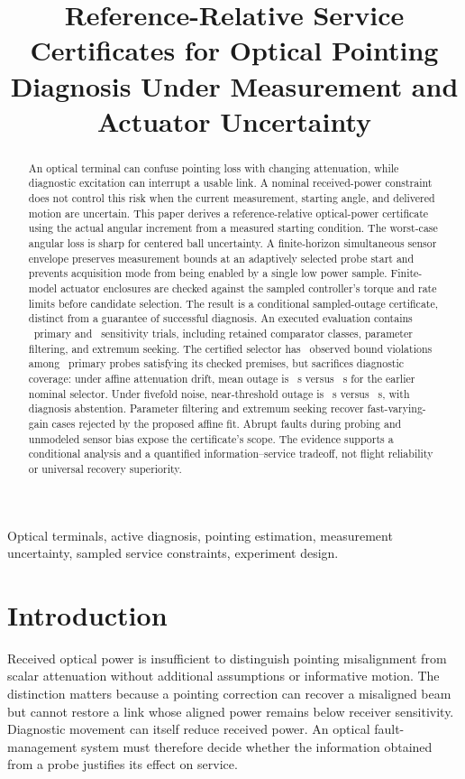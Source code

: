 \documentclass[10pt,journal]{IEEEtran}
\begin{document}
\title{Reference-Relative Service Certificates for Optical Pointing Diagnosis Under Measurement and Actuator Uncertainty}
\author{}
\maketitle
\begin{abstract}
An optical terminal can confuse pointing loss with changing attenuation, while diagnostic excitation can interrupt a usable link. A nominal received-power constraint does not control this risk when the current measurement, starting angle, and delivered motion are uncertain. This paper derives a reference-relative optical-power certificate using the actual angular increment from a measured starting condition. The worst-case angular loss is sharp for centered ball uncertainty. A finite-horizon simultaneous sensor envelope preserves measurement bounds at an adaptively selected probe start and prevents acquisition mode from being enabled by a single low power sample. Finite-model actuator enclosures are checked against the sampled controller's torque and rate limits before candidate selection. The result is a conditional sampled-outage certificate, distinct from a guarantee of successful diagnosis. An executed evaluation contains \NPrimary\ primary and \NSensitivity\ sensitivity trials, including retained comparator classes, parameter filtering, and extremum seeking. The certified selector has \ValidViolations\ observed bound violations among \ValidCertificates\ primary probes satisfying its checked premises, but sacrifices diagnostic coverage: under affine attenuation drift, mean outage is \UADDriftOutage~s versus \DAPDriftOutage~s for the earlier nominal selector. Under fivefold noise, near-threshold outage is \UADNoiseNearOutage~s versus \DAPNoiseNearOutage~s, with diagnosis abstention. Parameter filtering and extremum seeking recover fast-varying-gain cases rejected by the proposed affine fit. Abrupt faults during probing and unmodeled sensor bias expose the certificate's scope. The evidence supports a conditional analysis and a quantified information--service tradeoff, not flight reliability or universal recovery superiority.
\end{abstract}
\begin{IEEEkeywords}
Optical terminals, active diagnosis, pointing estimation, measurement uncertainty, sampled service constraints, experiment design.
\end{IEEEkeywords}

\section{Introduction}
Received optical power is insufficient to distinguish pointing misalignment from scalar attenuation without additional assumptions or informative motion. The distinction matters because a pointing correction can recover a misaligned beam but cannot restore a link whose aligned power remains below receiver sensitivity. Diagnostic movement can itself reduce received power. An optical fault-management system must therefore decide whether the information obtained from a probe justifies its effect on service.
\end{document}
